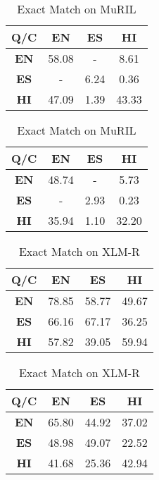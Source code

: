 \documentclass[12pt]{article}   %
\begin{document}
\begin{table}[h]
        \begin{minipage}{0.5\textwidth}
            \centering
		\begin{tabular}{|c|c|c|c|}
			\hline
 			\textbf{Q/C} &  \textbf{EN} &  \textbf{ES} &  \textbf{HI} \\
			\hline
			 \textbf{EN} & 58.08 & - &  8.61 \\
			\hline
			\textbf{ES} & - & 6.24 & 0.36 \\
			\hline
			\textbf{HI} & 47.09 & 1.39 & 43.33 \\
			\hline
		\end{tabular}
		\caption{F1 on MuRIL}
	\end{minipage}%
        \hfill
	\begin{minipage}{0.5\textwidth}
         	\centering
			\begin{tabular}{|c|c|c|c|}
				\hline
				 \textbf{Q/C} &  \textbf{EN} &  \textbf{ES} &  \textbf{HI} \\
				\hline
				\textbf{EN} & 48.74 & - & 5.73 \\
				 \hline
				\textbf{ES} & - & 2.93 & 0.23 \\
				\hline
				 \textbf{HI} & 35.94 & 1.10 & 32.20\\
				 \hline
			\end{tabular}
			\caption{Exact Match on MuRIL}
	\end{minipage}%
\end{table}

 \begin{table}[h]
        \begin{minipage}{0.5\textwidth}
            \centering
		\begin{tabular}{|c|c|c|c|}
			\hline
 			\textbf{Q/C} &  \textbf{EN} &  \textbf{ES} &  \textbf{HI} \\
			\hline
			 \textbf{EN} & 78.85 & 58.77 & 49.67 \\
			\hline
			\textbf{ES} & 66.16 & 67.17 & 36.25 \\
			\hline
			\textbf{HI} & 57.82 & 39.05 & 59.94 \\
			\hline
		\end{tabular}
		\caption{F1 on XLM-R}
	\end{minipage}%
        \hfill
	\begin{minipage}{0.5\textwidth}
         	\centering
			\begin{tabular}{|c|c|c|c|}
				\hline
				 \textbf{Q/C} &  \textbf{EN} &  \textbf{ES} &  \textbf{HI} \\
				\hline
				\textbf{EN} & 65.80& 44.92 & 37.02 \\
				 \hline
				\textbf{ES} & 48.98 & 49.07 & 22.52 \\
				\hline
				 \textbf{HI} & 41.68& 25.36 & 42.94\\
				 \hline
			\end{tabular}
			\caption{Exact Match on XLM-R}
	\end{minipage}%
\end{table}
\end{document}
